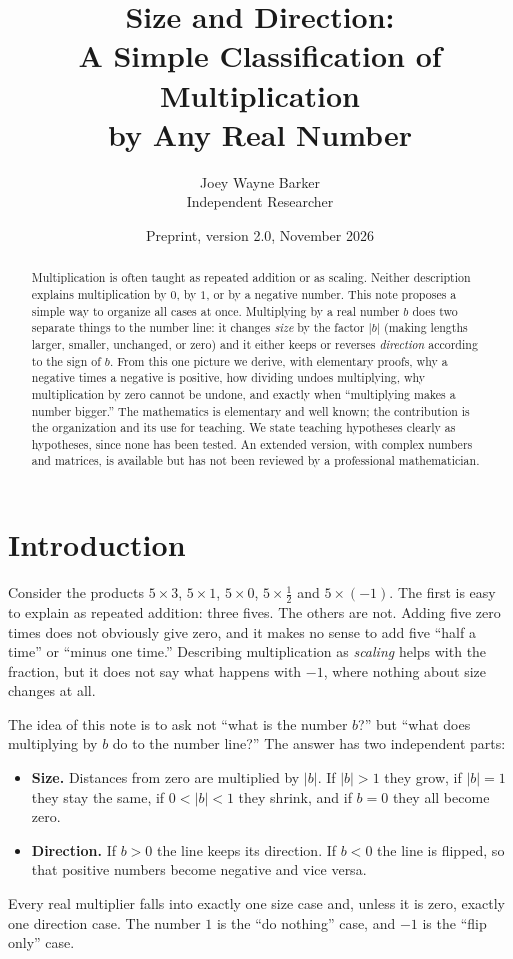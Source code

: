 \documentclass[12pt]{article}
\title{Size and Direction:\\
A Simple Classification of Multiplication\\by Any Real Number}
\author{Joey Wayne Barker \\ Independent Researcher}
\date{Preprint, version 2.0, November 2026}
\theoremstyle{definition}
\theoremstyle{remark}
\begin{document}
\maketitle

\begin{abstract}
Multiplication is often taught as repeated addition or as scaling. Neither description explains multiplication by $0$, by $1$, or by a negative number. This note proposes a simple way to organize all cases at once. Multiplying by a real number $b$ does two separate things to the number line: it changes \emph{size} by the factor $|b|$ (making lengths larger, smaller, unchanged, or zero) and it either keeps or reverses \emph{direction} according to the sign of $b$. From this one picture we derive, with elementary proofs, why a negative times a negative is positive, how dividing undoes multiplying, why multiplication by zero cannot be undone, and exactly when ``multiplying makes a number bigger.'' The mathematics is elementary and well known; the contribution is the organization and its use for teaching. We state teaching hypotheses clearly as hypotheses, since none has been tested. An extended version, with complex numbers and matrices, is available but has not been reviewed by a professional mathematician.
\end{abstract}

\section{Introduction}
Consider the products $5\times 3$, $5\times 1$, $5\times 0$, $5\times\tfrac12$ and $5\times(-1)$. The first is easy to explain as repeated addition: three fives. The others are not. Adding five zero times does not obviously give zero, and it makes no sense to add five ``half a time'' or ``minus one time.'' Describing multiplication as \emph{scaling} helps with the fraction, but it does not say what happens with $-1$, where nothing about size changes at all.

The idea of this note is to ask not ``what is the number $b$?'' but ``what does multiplying by $b$ do to the number line?'' The answer has two independent parts:
\begin{itemize}
  \item \textbf{Size.} Distances from zero are multiplied by $|b|$. If $|b|>1$ they grow, if $|b|=1$ they stay the same, if $0<|b|<1$ they shrink, and if $b=0$ they all become zero.
  \item \textbf{Direction.} If $b>0$ the line keeps its direction. If $b<0$ the line is flipped, so that positive numbers become negative and vice versa.
\end{itemize}
Every real multiplier falls into exactly one size case and, unless it is zero, exactly one direction case. The number $1$ is the ``do nothing'' case, and $-1$ is the ``flip only'' case.
\end{document}
